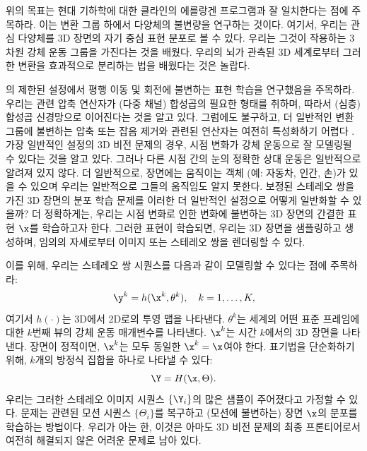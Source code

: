 \documentclass[../../book-main_ko.tex]{subfiles}
\begin{document}
\begin{remark}위의 목표는 현대 기하학에 대한 클라인의 에를랑겐 프로그램과 잘 일치한다는 점에 주목하라. 이는 변환 그룹 하에서 다양체의 불변량을 연구하는 것이다. 여기서, 우리는 관심 다양체를 3D 장면의 자기 중심 표현 분포로 볼 수 있다. 우리는 그것이 작용하는 3차원 강체 운동 그룹을 가진다는 것을 배웠다. 우리의 뇌가 관측된 3D 세계로부터 그러한 변환을 효과적으로 분리하는 법을 배웠다는 것은 놀랍다.
\end{remark}


의 제한된 설정에서 평행 이동 및 회전에 불변하는 표현 학습을 연구했음을 주목하라. 우리는 관련 압축 연산자가 (다중 채널) 합성곱의 필요한 형태를 취하며, 따라서 (심층) 합성곱 신경망으로 이어진다는 것을 알고 있다. 그럼에도 불구하고, 더 일반적인 변환 그룹에 불변하는 압축 또는 잡음 제거와 관련된 연산자는 여전히 특성화하기 어렵다 \cite{cohen2016group}.
가장 일반적인 설정의 3D 비전 문제의 경우, 시점 변화가 강체 운동으로 잘 모델링될 수 있다는 것을 알고 있다. 그러나 다른 시점 간의 눈의 정확한 상대 운동은 일반적으로 알려져 있지 않다. 더 일반적으로, 장면에는 움직이는 객체 (예: 자동차, 인간, 손)가 있을 수 있으며 우리는 일반적으로 그들의 움직임도 알지 못한다. 보정된 스테레오 쌍을 가진 3D 장면의 분포 학습 문제를 이러한 더 일반적인 설정으로 어떻게 일반화할 수 있을까? 더 정확하게는, 우리는 시점 변화로 인한 변화에 불변하는 3D 장면의 간결한 표현 $\x$를 학습하고자 한다. 그러한 표현이 학습되면, 우리는 3D 장면을 샘플링하고 생성하며, 임의의 자세로부터 이미지 또는 스테레오 쌍을 렌더링할 수 있다.

이를 위해, 우리는 스테레오 쌍 시퀀스를 다음과 같이 모델링할 수 있다는 점에 주목하라:
\begin{equation}
    \y^k = h(\x^k, \theta^k), \quad k=1, \ldots, K,
\end{equation}
여기서 $h(\cdot)$는 3D에서 2D로의 투영 맵을 나타낸다. $\theta^k$는 세계의 어떤 표준 프레임에 대한 $k$번째 뷰의 강체 운동 매개변수를 나타낸다. $\x^k$는 시간 $k$에서의 3D 장면을 나타낸다. 장면이 정적이면, $\x^k$는 모두 동일한 $\x^k = \x$여야 한다. 표기법을 단순화하기 위해, $k$개의 방정식 집합을 하나로 나타낼 수 있다:
\begin{equation}
    \Y = H(\x,\Theta).
\end{equation}
우리는 그러한 스테레오 이미지 시퀀스 $\{\Y_i\}$의 많은 샘플이 주어졌다고 가정할 수 있다. 문제는 관련된 모션 시퀀스 $\{\Theta_i\}$를 복구하고 (모션에 불변하는) 장면 $\x$의 분포를 학습하는 방법이다. 우리가 아는 한, 이것은 아마도 3D 비전 문제의 최종 프론티어로서 여전히 해결되지 않은 어려운 문제로 남아 있다.
\end{document}
